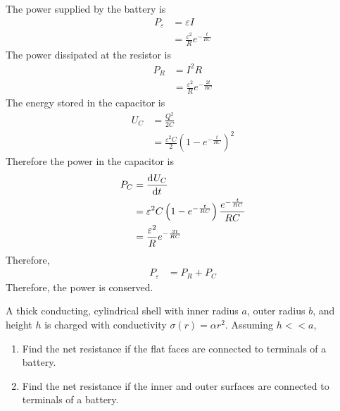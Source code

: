 \documentclass[fleqn, a4paper, 12pt, twoside]{article}
\theoremstyle{definition}
\theoremstyle{theorem}
\begin{document}
The power supplied by the battery is
\begin{align*}
	P_{\varepsilon} & = \varepsilon I \\
                        & = \frac{\varepsilon^2}{R} e^{-\frac{t}{R C}}
\end{align*}
The power dissipated at the resistor is
\begin{align*}
	P_R & = I^2 R \\
            & = \frac{\varepsilon^2}{R} e^{-\frac{2 t}{R C}}
\end{align*}
The energy stored in the capacitor is
\begin{align*}
	U_C & = \frac{Q^2}{2 C} \\
            & = \frac{\varepsilon^2 C}{2} \left( 1 - e^{-\frac{t}{R C}} \right)^2
\end{align*}
Therefore the power in the capacitor is
\begin{align*}
	P_C & = \dod{U_C}{t}                                                                         \\
            & = \varepsilon^2 C \left( 1 - e^{-\frac{t}{R C}} \right) \frac{e^{-\frac{t}{R C}}}{R C} \\
            & = \frac{\varepsilon^2}{R} e^{-\frac{2 t}{R C}}
\end{align*}
Therefore,
\begin{align*}
	P_{\varepsilon} & = P_R + P_C
\end{align*}
Therefore, the power is conserved.

\begin{question}
	A thick conducting, cylindrical shell with inner radius $a$, outer radius $b$, and height $h$ is charged with conductivity $\sigma(r) = \alpha r^2$.
	Assuming $h << a$,
	\begin{enumerate}
		\item Find the net resistance if the flat faces are connected to terminals of a battery.
		\item Find the net resistance if the inner and outer surfaces are connected to terminals of a battery.
	\end{enumerate}
\end{question}
\end{document}
